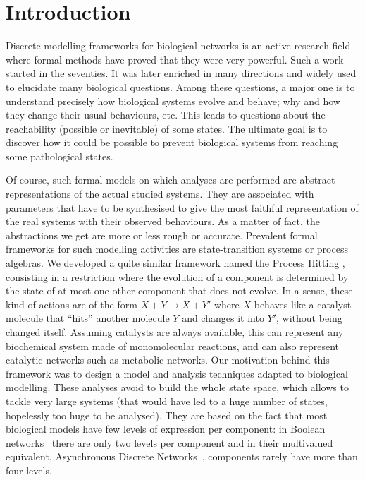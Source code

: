 \section{Introduction}
\label{sec:intro}

Discrete modelling frameworks for biological networks is an active research field where formal methods have proved that they were very powerful.
Such a work started in the seventies.
It was later enriched in many directions and widely used to elucidate many biological questions.
Among these questions, a major one is to understand precisely how biological systems evolve and behave; why and how they change their usual behaviours, etc.
This leads to questions about the reachability (possible or inevitable) of some states.
The ultimate goal is to discover how it could be possible to prevent biological systems from reaching some pathological states.

Of course, such formal models on which analyses are performed are abstract representations of the actual studied systems.
They are associated with parameters that have to be synthesised %
to give the most faithful representation of the real systems with their observed behaviours.
As a matter of fact, the abstractions we get are more or less rough or accurate.
Prevalent formal frameworks for such modelling activities are state-transition systems or process algebras. %
We developed a quite similar framework named the Process Hitting \cite{PMR10-TCSB},
consisting in a restriction where the evolution of a component is determined by the state of at most one other component that does not evolve.
In a sense, these kind of actions are of the form $X + Y \rightarrow X + Y'$ where $X$ behaves like a catalyst molecule that “hits” another molecule $Y$ and changes it into $Y'$, without being changed itself.
Assuming catalysts are always available, this can represent any biochemical system made of monomolecular reactions, and can also represent catalytic networks such as metabolic networks.
Our motivation behind this framework was to design a model and analysis techniques adapted to biological modelling.
These analyses avoid to build the whole state space, which allows to tackle very large systems (that would have led to a huge number of states, hopelessly too huge to be analysed).
They are based on the fact that most biological models have few levels of expression per component:
in Boolean networks~\cite{kauffman69,Thomas73} there are only two levels per component and in their multivalued equivalent, Asynchronous Discrete Networks~\cite{deJong02}, components rarely have more than four levels.

